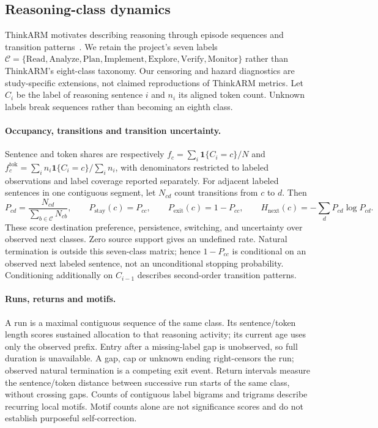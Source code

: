 \subsection{Reasoning-class dynamics}

ThinkARM motivates describing reasoning through episode sequences and transition
patterns~\cite{newmetrics_li2026}. We retain the project's seven labels
$\mathcal C=\{\mathrm{Read},\mathrm{Analyze},\mathrm{Plan},\mathrm{Implement},
\mathrm{Explore},\mathrm{Verify},\mathrm{Monitor}\}$ rather than ThinkARM's
eight-class taxonomy. Our censoring and hazard diagnostics are study-specific
extensions, not claimed reproductions of ThinkARM metrics.
Let $C_i$ be the label of reasoning sentence $i$ and $n_i$ its aligned token count.
Unknown labels break sequences rather than becoming an eighth class.

\paragraph{Occupancy, transitions and transition uncertainty.}
Sentence and token shares are respectively
$f_c=\sum_i\mathbf{1}\{C_i=c\}/N$ and
$f_c^{\mathrm{tok}}=\sum_i n_i\mathbf{1}\{C_i=c\}/\sum_i n_i$,
with denominators restricted to labeled observations and label coverage reported
separately. For adjacent labeled sentences in one contiguous segment, let $N_{cd}$
count transitions from $c$ to $d$. Then
\begin{equation}
 P_{cd}=\frac{N_{cd}}{\sum_{b\in\mathcal C}N_{cb}},\qquad
 P_{\mathrm{stay}}(c)=P_{cc},\qquad
 P_{\mathrm{exit}}(c)=1-P_{cc},\qquad
 H_{\mathrm{next}}(c)=-\sum_d P_{cd}\log P_{cd}.
 \label{eq:new-transitions}
\end{equation}
These score destination preference, persistence, switching, and uncertainty over
observed next classes. Zero source support gives an undefined rate. Natural
termination is outside this seven-class matrix; hence $1-P_{cc}$ is conditional
on an observed next labeled sentence, not an unconditional stopping probability.
Conditioning additionally on $C_{i-1}$ describes second-order transition patterns.

\paragraph{Runs, returns and motifs.}
A run is a maximal contiguous sequence of the same class. Its sentence/token
length scores sustained allocation to that reasoning activity; its current age
uses only the observed prefix. Entry after a missing-label gap is unobserved, so
full duration is unavailable. A gap, cap or unknown ending right-censors the run;
observed natural termination is a competing exit event.
Return intervals measure the sentence/token distance between successive run
starts of the same class, without crossing gaps. Counts of contiguous label
bigrams and trigrams describe recurring local motifs. Motif counts alone are
not significance scores and do not establish purposeful self-correction.

